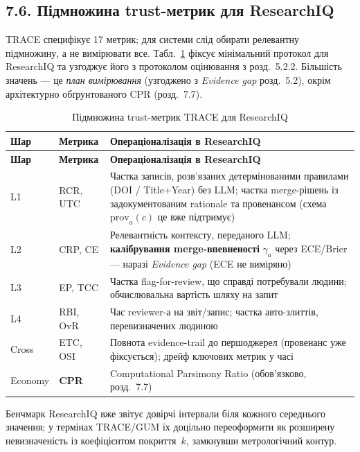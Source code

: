 \subsection*{7.6. Підмножина trust-метрик для ResearchIQ}

TRACE специфікує 17 метрик; для системи слід обирати релевантну підмножину, а не вимірювати все. Табл.~\ref{tab:trace-metrics} фіксує мінімальний протокол для ResearchIQ та узгоджує його з протоколом оцінювання з розд.~5.2.2. Більшість значень --- це \emph{план вимірювання} (узгоджено з \textit{Evidence gap} розд.~5.2), окрім архітектурно обґрунтованого CPR (розд.~7.7).

\begin{longtable}{@{}p{}p{}p{}@{}}
\caption{Підмножина trust-метрик TRACE для ResearchIQ}\label{tab:trace-metrics}\\
\toprule
\textbf{Шар} & \textbf{Метрика} & \textbf{Операціоналізація в ResearchIQ} \\
\midrule
\endfirsthead
\toprule
\textbf{Шар} & \textbf{Метрика} & \textbf{Операціоналізація в ResearchIQ} \\
\midrule
\endhead
L1 & RCR, UTC & Частка записів, розв'язаних детермінованими правилами (DOI / Title+Year) без LLM; частка merge-рішень із задокументованим rationale та провенансом (схема $\mathrm{prov}_a(c)$ це вже підтримує) \\
L2 & CRP, CE & Релевантність контексту, переданого LLM; \textbf{калібрування merge-впевненості} $\gamma_a$ через ECE/Brier --- наразі \textit{Evidence gap} (ECE не виміряно) \\
L3 & EP, TCC & Частка flag-for-review, що справді потребували людини; обчислювальна вартість шляху на запит \\
L4 & RBI, OvR & Час reviewer-а на звіт/запис; частка авто-злиттів, перевизначених людиною \\
Cross & ETC, OSI & Повнота evidence-trail до першоджерел (провенанс уже фіксується); дрейф ключових метрик у часі \\
Economy & \textbf{CPR} & Computational Parsimony Ratio (обов'язково, розд.~7.7) \\
\bottomrule
\end{longtable}

Бенчмарк ResearchIQ вже звітує довірчі інтервали біля кожного середнього значення; у термінах TRACE/GUM їх доцільно переоформити як розширену невизначеність із коефіцієнтом покриття~$k$, замкнувши метрологічний контур.

